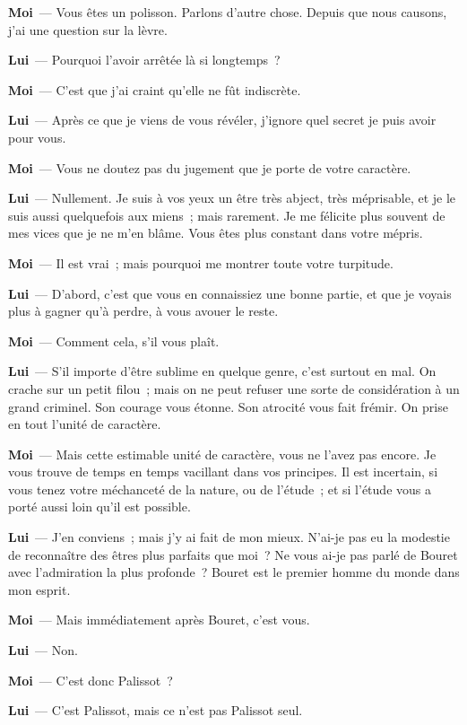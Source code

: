 \documentclass[french,twoside]{book} %
\newcommand{\labelchar}[1]{\textbf{\color{rubric} #1}}
\begin{document}
\labelchar{Moi} — Vous êtes un polisson. Parlons d’autre chose. Depuis que nous causons, j’ai une question sur la lèvre.\par
\labelchar{Lui} — Pourquoi l’avoir arrêtée là si longtemps ?\par
\labelchar{Moi} — C’est que j’ai craint qu’elle ne fût indiscrète.\par
\labelchar{Lui} — Après ce que je viens de vous révéler, j’ignore quel secret je puis avoir pour vous.\par
\labelchar{Moi} — Vous ne doutez pas du jugement que je porte de votre caractère.\par
\labelchar{Lui} — Nullement. Je suis à vos yeux un être très abject, très méprisable, et je le suis aussi quelquefois aux miens ; mais rarement. Je me félicite plus souvent de mes vices que je ne m’en blâme. Vous êtes plus constant dans votre mépris.\par
\labelchar{Moi} — Il est vrai ; mais pourquoi me montrer toute votre turpitude.\par
\labelchar{Lui} — D’abord, c’est que vous en connaissiez une bonne partie, et que je voyais plus à gagner qu’à perdre, à vous avouer le reste.\par
\labelchar{Moi} — Comment cela, s’il vous plaît.\par
\labelchar{Lui} — S’il importe d’être sublime en quelque genre, c’est surtout en mal. On crache sur un petit filou ; mais on ne peut refuser une sorte de considération à un grand criminel. Son courage vous étonne. Son atrocité vous fait frémir. On prise en tout l’unité de caractère.\par
\labelchar{Moi} — Mais cette estimable unité de caractère, vous ne l’avez pas encore. Je vous trouve de temps en temps vacillant dans vos principes. Il est incertain, si vous tenez votre méchanceté de la nature, ou de l’étude ; et si l’étude vous a porté aussi loin qu’il est possible.\par
\labelchar{Lui} — J’en conviens ; mais j’y ai fait de mon mieux. N’ai-je pas eu la modestie de reconnaître des êtres plus parfaits que moi ? Ne vous ai-je pas parlé de Bouret avec l’admiration la plus profonde ? Bouret est le premier homme du monde dans mon esprit.\par
\labelchar{Moi} — Mais immédiatement après Bouret, c’est vous.\par
\labelchar{Lui} — Non.\par
\labelchar{Moi} — C’est donc Palissot ?\par
\labelchar{Lui} — C’est Palissot, mais ce n’est pas Palissot seul.\par
\end{document}
